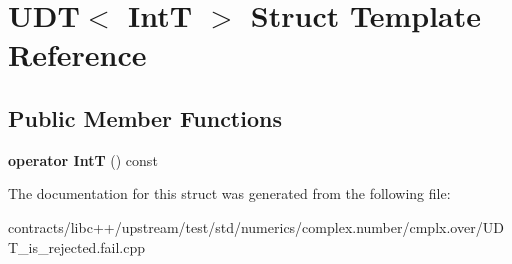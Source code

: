 \hypertarget{struct_u_d_t}{}\section{U\+DT$<$ IntT $>$ Struct Template Reference}
\label{struct_u_d_t}
\subsection*{Public Member Functions}
\begin{DoxyCompactItemize}
\item 
\mbox{\label{struct_u_d_t_ad22c67a00d63914db11fac7f12d04650}} 
{\bfseries operator IntT} () const
\end{DoxyCompactItemize}


The documentation for this struct was generated from the following file\+:\begin{DoxyCompactItemize}
\item 
contracts/libc++/upstream/test/std/numerics/complex.\+number/cmplx.\+over/U\+D\+T\+\_\+is\+\_\+rejected.\+fail.\+cpp\end{DoxyCompactItemize}
